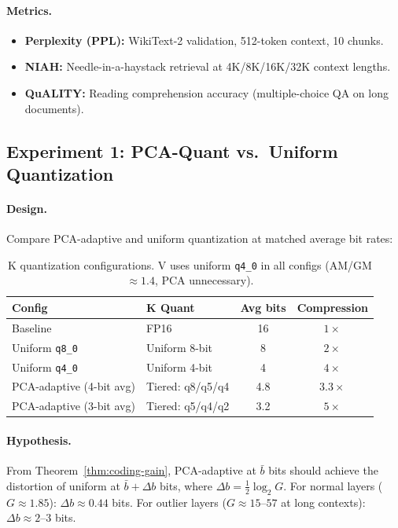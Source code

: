 \paragraph{Metrics.}
\begin{itemize}
    \item \textbf{Perplexity (PPL):} WikiText-2 validation, 512-token context, 10 chunks.
    \item \textbf{NIAH:} Needle-in-a-haystack retrieval at 4K/8K/16K/32K context lengths.
    \item \textbf{QuALITY:} Reading comprehension accuracy (multiple-choice QA on long documents).
\end{itemize}

\subsection{Experiment 1: PCA-Quant vs.\ Uniform Quantization}

\paragraph{Design.}
Compare PCA-adaptive and uniform quantization at matched average bit rates:

\begin{table}[h]
\centering
\begin{tabular}{llcc}
\toprule
\textbf{Config} & \textbf{K Quant} & \textbf{Avg bits} & \textbf{Compression} \\
\midrule
Baseline & FP16 & 16 & $1\times$ \\
Uniform \texttt{q8\_0} & Uniform 8-bit & 8 & $2\times$ \\
Uniform \texttt{q4\_0} & Uniform 4-bit & 4 & $4\times$ \\
PCA-adaptive (4-bit avg) & Tiered: q8/q5/q4 & 4.8 & $3.3\times$ \\
PCA-adaptive (3-bit avg) & Tiered: q5/q4/q2 & 3.2 & $5\times$ \\
\bottomrule
\end{tabular}
\caption{K quantization configurations. V uses uniform \texttt{q4\_0} in all configs (AM/GM $\approx 1.4$, PCA unnecessary).}
\label{tab:exp1-configs}
\end{table}

\paragraph{Hypothesis.}
From Theorem~\ref{thm:coding-gain}, PCA-adaptive at $\bar{b}$ bits should achieve the distortion of uniform at $\bar{b} + \Delta b$ bits, where $\Delta b = \frac{1}{2}\log_2 G$. For normal layers ($G \approx 1.85$): $\Delta b \approx 0.44$ bits. For outlier layers ($G \approx 15$--$57$ at long contexts): $\Delta b \approx 2$--$3$ bits.

